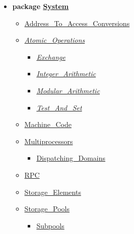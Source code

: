 \documentclass[english]{article}
\begin{document}
\begin{scriptsize}
\begin{multicols*}{5}
\begin{itemize}[leftmargin=0mm]
\begin{itemize}[leftmargin=5mm]
\begin{itemize}[leftmargin=5mm]
	\end{itemize}
  \item[] \textbf{package \href{http://www.ada-auth.org/standards/22rm/html/RM-13-7.html}{System}}
	\begin{itemize}[leftmargin=5mm]
	\item[] \href{http://www.ada-auth.org/standards/22rm/html/RM-13-7-2.html}{Address\_To\_Access\_Conversions}
	\item[] \href{http://www.ada-auth.org/standards/22rm/html/RM-C-6-1.html}{\textit{Atomic\_Operations}}
	  \begin{itemize}[leftmargin=5mm]
	  \item[] \href{http://www.ada-auth.org/standards/22rm/html/RM-C-6-2.html}{\textit{Exchange}}
	  \item[] \href{http://www.ada-auth.org/standards/22rm/html/RM-C-6-4.html}{\textit{Integer\_Arithmetic}}
	  \item[] \href{http://www.ada-auth.org/standards/22rm/html/RM-C-6-5.html}{\textit{Modular\_Arithmetic}}
	  \item[] \href{http://www.ada-auth.org/standards/22rm/html/RM-C-6-3.html}{\textit{Test\_And\_Set}}
	  \end{itemize}
	\item[] \href{http://www.ada-auth.org/standards/22rm/html/RM-13-8.html}{Machine\_Code}
	\item[] \href{http://www.ada-auth.org/standards/22rm/html/RM-D-16.html}{Multiprocessors}
	  \begin{itemize}[leftmargin=5mm]
	  \item[] \href{http://www.ada-auth.org/standards/22rm/html/RM-D-16-1.html}{Dispatching\_Domains}
      \end{itemize}
    \item[] \href{http://www.ada-auth.org/standards/22rm/html/RM-E-5.html}{RPC}
    \item[] \href{http://www.ada-auth.org/standards/22rm/html/RM-13-7-1.html}{Storage\_Elements}
    \item[] \href{http://www.ada-auth.org/standards/22rm/html/RM-13-11.html}{Storage\_Pools}
      \begin{itemize}[leftmargin=5mm]
      \item[] \href{http://www.ada-auth.org/standards/22rm/html/RM-13-11-4.html}{Subpools}
      \end{itemize}
    \end{itemize}
  \end{itemize}
\end{itemize}
\end{multicols*}
\end{scriptsize}
\end{document}
